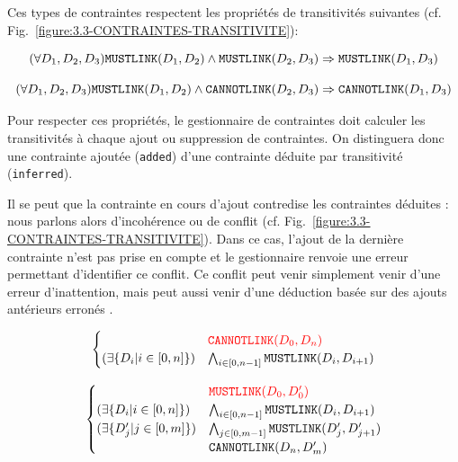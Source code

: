 		Ces types de contraintes respectent les propriétés de transitivités suivantes (cf. Fig.~\ref{figure:3.3-CONTRAINTES-TRANSITIVITE}):
		
		\begin{equation}
			(\forall D_1,D_2,D_3) \\
			\texttt{MUSTLINK}(D_1,D_2) \wedge \texttt{MUSTLINK}(D_2,D_3)
			\Rightarrow \texttt{MUSTLINK}(D_1,D_3)
		\end{equation}
		
		\begin{equation}
			(\forall D_1,D_2,D_3) \\
			\texttt{MUSTLINK}(D_1,D_2) \wedge \texttt{CANNOTLINK}(D_2,D_3)
			\Rightarrow \texttt{CANNOTLINK}(D_1,D_3)
		\end{equation}
		
		Pour respecter ces propriétés, le gestionnaire de contraintes doit calculer les transitivités à chaque ajout ou suppression de contraintes. On distinguera donc une contrainte ajoutée (\texttt{added}) d'une contrainte déduite par transitivité (\texttt{inferred}).
		
		Il se peut que la contrainte en cours d'ajout contredise les contraintes déduites : nous parlons alors d'incohérence ou de conflit (cf. Fig.~\ref{figure:3.3-CONTRAINTES-TRANSITIVITE}). Dans ce cas, l'ajout de la dernière contrainte n'est pas prise en compte et le gestionnaire renvoie une erreur permettant d'identifier ce conflit.
		Ce conflit peut venir simplement venir d'une erreur d’inattention, mais peut aussi venir d'une déduction basée sur des ajouts antérieurs erronés .
		
		\begin{equation}
			\begin{cases}
				& \textcolor{red}{\texttt{CANNOTLINK}(D_0,D_n)} \\
				(\exists \{D_i | i\in[0,n]\})
				& \bigwedge_{i\in[0,n-1]} \texttt{MUSTLINK}(D_i,D_{i+1})
			\end{cases}
		\end{equation}
		
		\begin{equation}
			\begin{cases}
				& \textcolor{red}{\texttt{MUSTLINK}(D_0,D'_0)} \\
				(\exists \{D_i | i\in[0,n]\})
				& \bigwedge_{i\in[0,n-1]} \texttt{MUSTLINK}(D_i,D_{i+1})\\
				(\exists \{D'_j | j\in[0,m]\})
				& \bigwedge_{j\in[0,m-1]} \texttt{MUSTLINK}(D'_j,D'_{j+1})\\
				& \texttt{CANNOTLINK}(D_n,D'_m)
			\end{cases}
		\end{equation}
		
